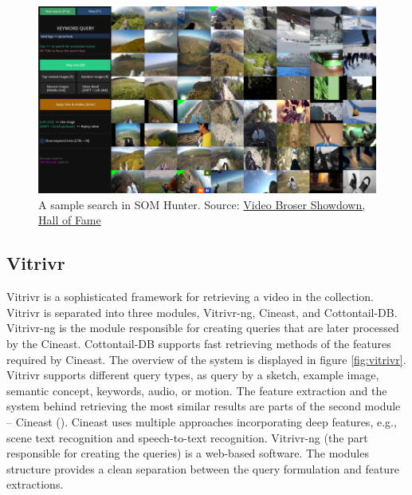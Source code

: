 \begin{figure}
    \centering
    \includegraphics[width=0.99\linewidth]{img/som_hunter_small.png}
    \caption{A sample search in SOM Hunter. Source: \href{https://videobrowsershowdown.org/hall-of-fame/}{Video Broser Showdown, Hall of Fame}}
    \label{fig:som_hunter}
\end{figure}

\subsection{Vitrivr}

Vitrivr \citep{rossetto2016vitrivr} is a sophisticated framework for retrieving a video in the collection. Vitrivr is separated into three modules, Vitrivr-ng, Cineast, and Cottontail-DB.  Vitrivr-ng is the module responsible for creating queries that are later processed by the Cineast. Cottontail-DB supports fast retrieving methods of the features required by Cineast. The overview of the system is displayed in figure \ref{fig:vitrivr}. Vitrivr supports different query types, as query by a sketch, example image, semantic concept, keywords, audio, or motion. The feature extraction and the system behind retrieving the most similar results are parts of the second module -- Cineast (\cite{rossetto2016searching}). Cineast uses multiple approaches incorporating deep features, e.g., scene text recognition and speech-to-text recognition. Vitrivr-ng (the part responsible for creating the queries) is a web-based software. The modules structure provides a clean separation between the query formulation and feature extractions.


